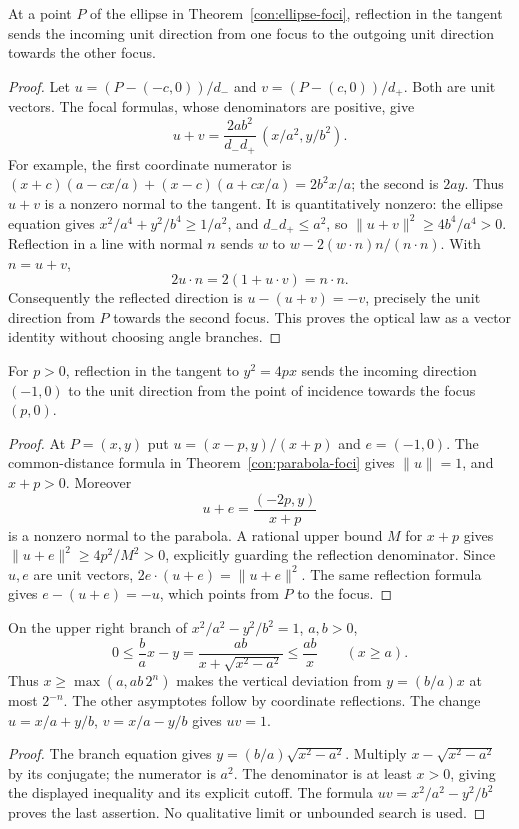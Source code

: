 \begin{theorem}\label{con:ellipse-reflection}
At a point $P$ of the ellipse in Theorem~\ref{con:ellipse-foci}, reflection
in the tangent sends the incoming unit direction from one focus to the
outgoing unit direction towards the other focus.
\end{theorem}
\begin{proof}
Let $u=(P-(-c,0))/d_-$ and $v=(P-(c,0))/d_+$. Both are unit vectors.
The focal formulas, whose denominators are positive, give
\[
 u+v=\frac{2ab^2}{d_-d_+}\,(x/a^2,y/b^2).
\]
For example, the first coordinate numerator is
$(x+c)(a-cx/a)+(x-c)(a+cx/a)=2b^2x/a$;
the second is $2ay$. Thus $u+v$ is a nonzero normal to the tangent.
It is quantitatively nonzero: the ellipse equation gives
$x^2/a^4+y^2/b^4\ge1/a^2$, and $d_-d_+\le a^2$, so
$\|u+v\|^2\ge4b^4/a^4>0$. Reflection in a line with normal $n$ sends $w$ to
$w-2(w\cdot n)n/(n\cdot n)$. With $n=u+v$,
\[
 2u\cdot n=2(1+u\cdot v)=n\cdot n.
\]
Consequently the reflected direction is $u-(u+v)=-v$, precisely the
unit direction from $P$ towards the second focus. This proves the
optical law as a vector identity without choosing angle branches.
\end{proof}

\begin{theorem}\label{con:parabola-reflection}
For $p>0$, reflection in the tangent to $y^2=4px$ sends the incoming
direction $(-1,0)$ to the unit direction from the point of incidence
towards the focus $(p,0)$.
\end{theorem}
\begin{proof}
At $P=(x,y)$ put $u=(x-p,y)/(x+p)$ and $e=(-1,0)$.
The common-distance formula in Theorem~\ref{con:parabola-foci} gives
$\|u\|=1$, and $x+p>0$. Moreover
\[
 u+e=\frac{(-2p,y)}{x+p}
\]
is a nonzero normal to the parabola. A rational upper bound $M$ for
$x+p$ gives $\|u+e\|^2\ge4p^2/M^2>0$, explicitly guarding the
reflection denominator. Since $u,e$ are unit vectors,
$2e\cdot(u+e)=\|u+e\|^2$. The same reflection formula gives
$e-(u+e)=-u$, which points from $P$ to the focus.
\end{proof}

\begin{proposition}\label{con:asymptotes}
On the upper right branch of $x^2/a^2-y^2/b^2=1$, $a,b>0$,
\[
 0\le \frac ba x-y
 =\frac{ab}{x+\sqrt{x^2-a^2}}\le\frac{ab}{x}\qquad(x\ge a).
\]
Thus $x\ge\max(a,ab\,2^n)$ makes the vertical deviation from
$y=(b/a)x$ at most $2^{-n}$. The other asymptotes follow by coordinate
reflections. The change $u=x/a+y/b$, $v=x/a-y/b$ gives $uv=1$.
\end{proposition}
\begin{proof}
The branch equation gives $y=(b/a)\sqrt{x^2-a^2}$.
Multiply $x-\sqrt{x^2-a^2}$ by its conjugate; the numerator is $a^2$.
The denominator is at least $x>0$, giving the displayed inequality
and its explicit cutoff. The formula $uv=x^2/a^2-y^2/b^2$ proves
the last assertion. No qualitative limit or unbounded search is used.
\end{proof}

